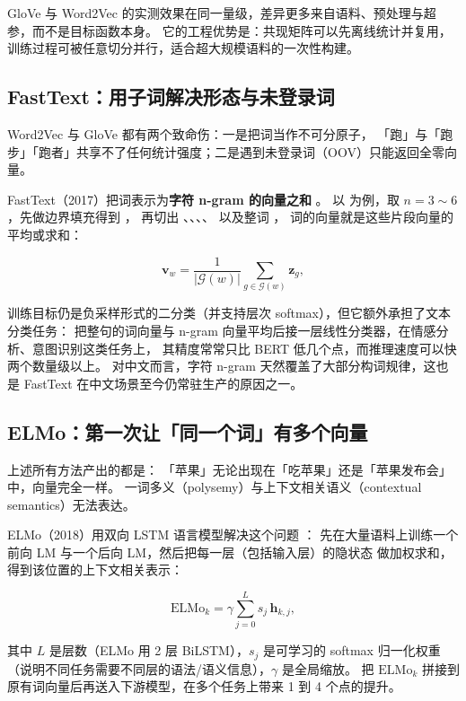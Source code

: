 GloVe 与 Word2Vec 的实测效果在同一量级，差异更多来自语料、预处理与超参，而不是目标函数本身。
它的工程优势是：共现矩阵可以先离线统计并复用，训练过程可被任意切分并行，适合超大规模语料的一次性构建。

\subsection{FastText：用子词解决形态与未登录词}

Word2Vec 与 GloVe 都有两个致命伤：一是把词当作不可分原子，
「跑」与「跑步」「跑者」共享不了任何统计强度；二是遇到未登录词（OOV）只能返回全零向量。

FastText（2017）把词表示为\textbf{字符 n-gram 的向量之和} \cite{bojanowski2017fasttext}。
以  为例，取 $n = 3 \sim 6$，先做边界填充得到 ，
再切出 、、、、 以及整词 ，
词的向量就是这些片段向量的平均或求和：

\begin{equation}
\bm{v}_{w} = \frac{1}{|\mathcal{G}(w)|} \sum_{g \in \mathcal{G}(w)} \bm{z}_g ,
\label{eq:fasttext}
\end{equation}

训练目标仍是负采样形式的二分类（并支持层次 softmax），但它额外承担了文本分类任务：
把整句的词向量与 n-gram 向量平均后接一层线性分类器，在情感分析、意图识别这类任务上，
其精度常常只比 BERT 低几个点，而推理速度可以快两个数量级以上。
对中文而言，字符 n-gram 天然覆盖了大部分构词规律，这也是 FastText 在中文场景至今仍常驻生产的原因之一。

\subsection{ELMo：第一次让「同一个词」有多个向量}

上述所有方法产出的都是：
「苹果」无论出现在「吃苹果」还是「苹果发布会」中，向量完全一样。
一词多义（polysemy）与上下文相关语义（contextual semantics）无法表达。

ELMo（2018）用双向 LSTM 语言模型解决这个问题 \cite{peters2018elmo}：
先在大量语料上训练一个前向 LM 与一个后向 LM，然后把每一层（包括输入层）的隐状态
做加权求和，得到该位置的上下文相关表示：

\begin{equation}
\text{ELMo}_k = \gamma \sum_{j=0}^{L} s_j \, \bm{h}_{k,j} ,
\label{eq:elmo}
\end{equation}

其中 $L$ 是层数（ELMo 用 2 层 BiLSTM），$s_j$ 是可学习的 softmax 归一化权重
（说明不同任务需要不同层的语法/语义信息），$\gamma$ 是全局缩放。
把 $\text{ELMo}_k$ 拼接到原有词向量后再送入下游模型，在多个任务上带来 1 到 4 个点的提升。

